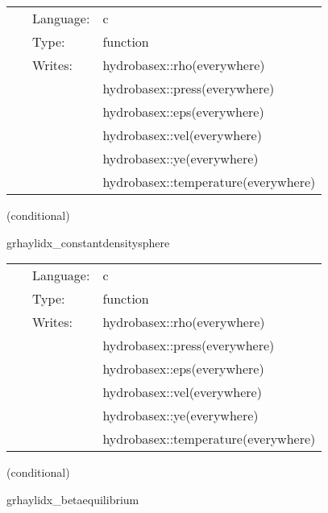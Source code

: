 \documentclass{article}
\begin{document}
\hspace{5mm}{\it set initial hydrodynamic data for 1d test } 


\hspace{5mm}

 \begin{tabular*}{160mm}{cll} 
~ & Language:  & c \\ 
~ & Type:  & function \\ 
~ & Writes:  & hydrobasex::rho(everywhere) \\ 
~& ~ &hydrobasex::press(everywhere)\\ 
~& ~ &hydrobasex::eps(everywhere)\\ 
~& ~ &hydrobasex::vel(everywhere)\\ 
~& ~ &hydrobasex::ye(everywhere)\\ 
~& ~ &hydrobasex::temperature(everywhere)\\ 
\end{tabular*} 


\vspace{5mm}

   (conditional) 

\hspace{5mm} grhaylidx\_constantdensitysphere 

\hspace{5mm}{\it set initial hydrodynamic data for 1d test } 


\hspace{5mm}

 \begin{tabular*}{160mm}{cll} 
~ & Language:  & c \\ 
~ & Type:  & function \\ 
~ & Writes:  & hydrobasex::rho(everywhere) \\ 
~& ~ &hydrobasex::press(everywhere)\\ 
~& ~ &hydrobasex::eps(everywhere)\\ 
~& ~ &hydrobasex::vel(everywhere)\\ 
~& ~ &hydrobasex::ye(everywhere)\\ 
~& ~ &hydrobasex::temperature(everywhere)\\ 
\end{tabular*} 


\vspace{5mm}

   (conditional) 

\hspace{5mm} grhaylidx\_betaequilibrium 
\end{document}
